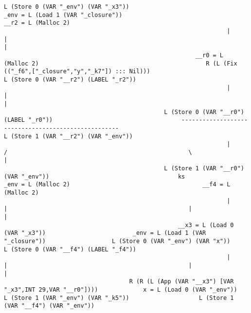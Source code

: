 \begin{landscape}
\begin{lstlisting}[basicstyle=\fontsize{5.5}{6.5}\selectfont\ttfamily]
                                               L (Store 0 (VAR "_env") (VAR "_x3"))                                                _env = L (Load 1 (VAR "_closure"))                                                        __r2 = L (Malloc 2)
                                                                |                                                                                  |                                                                                  |
                                                       __r0 = L (Malloc 2)                                                R (L (Fix (("_f6",["_closure","y","_k7"]) ::: Nil)))                                      L (Store 0 (VAR "__r2") (LABEL "_r2"))
                                                                |                                                                                  |                                                                                  |
                                              L (Store 0 (VAR "__r0") (LABEL "_r0"))                                     ----------------------------------------------------                                       L (Store 1 (VAR "__r2") (VAR "_env"))
                                                                |                                                       /                                                    \                                                        |
                                              L (Store 1 (VAR "__r0") (VAR "_env"))                                     ks                                          _env = L (Malloc 2)                                      __f4 = L (Malloc 2)
                                                                |                                                       |                                                    |                                                        |
                                                  __x3 = L (Load 0 (VAR "_x3"))                         _env = L (Load 1 (VAR "_closure"))                   L (Store 0 (VAR "_env") (VAR "x"))                     L (Store 0 (VAR "__f4") (LABEL "_f4"))
                                                                |                                                       |                                                    |                                                        |
                                    R (R (L (App (VAR "__x3") [VAR "_x3",INT 29,VAR "__r0"])))             x = L (Load 0 (VAR "_env"))                      L (Store 1 (VAR "_env") (VAR "_k5"))                    L (Store 1 (VAR "__f4") (VAR "_env"))

\end{lstlisting}
\end{landscape}
